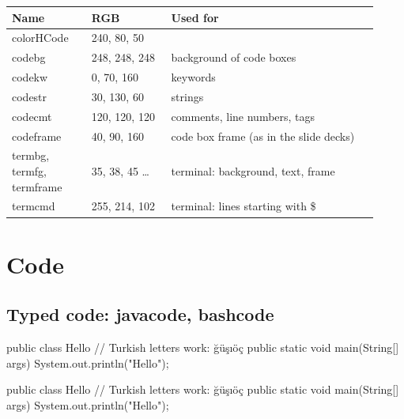\documentclass[11pt]{amsart}         %
\newcommand{\cs}[1]{\hCode{\textbackslash #1}}
\begin{document}
\begin{center}\small
\begin{tabular}{@{}L{0.20\linewidth}L{0.20\linewidth}L{0.52\linewidth}@{}}
	\toprule
	\textbf{Name} & \textbf{RGB} & \textbf{Used for} \\
	\midrule
	colorHCode & 240, 80, 50   & \cs{hCode} \\
	codebg     & 248, 248, 248 & background of code boxes \\
	codekw     & 0, 70, 160    & keywords \\
	codestr    & 30, 130, 60   & strings \\
	codecmt    & 120, 120, 120 & comments, line numbers, tags \\
	codeframe  & 40, 90, 160   & code box frame (as in the slide decks) \\
	termbg, termfg, termframe & 35, 38, 45 \dots & terminal: background, text, frame \\
	termcmd    & 255, 214, 102 & terminal: lines starting with \$ \\
	\bottomrule
\end{tabular}
\end{center}




\section{Code}\label{sec:code}

\subsection{Typed code: javacode, bashcode}

\begin{texcode}
\begin{javacode}
public class Hello {   // Turkish letters work: ğüşıöç
    public static void main(String[] args) {
        System.out.println("Hello");
    }
}
\end{javacode}
\end{texcode}

\begin{javacode}
public class Hello {   // Turkish letters work: ğüşıöç
    public static void main(String[] args) {
        System.out.println("Hello");
    }
}
\end{javacode}
\end{document}

